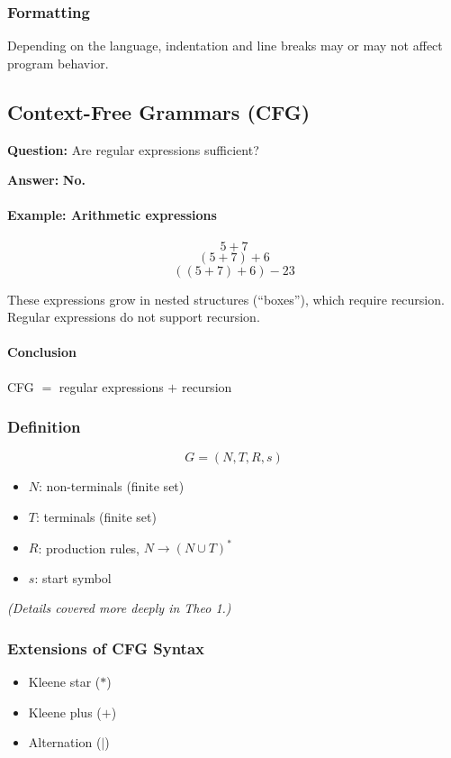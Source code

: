 \documentclass{article}
\begin{document}
\subsubsection{Formatting}
Depending on the language, indentation and line breaks may or may not affect program behavior.


\subsection{Context-Free Grammars (CFG)}

\textbf{Question:} Are regular expressions sufficient?

\textbf{Answer:} \textbf{No.}

\paragraph{Example: Arithmetic expressions}
\[
5 + 7
\]
\[
(5 + 7) + 6
\]
\[
((5 + 7) + 6) - 23
\]

These expressions grow in nested structures (``boxes''), which require recursion.  
Regular expressions do not support recursion.

\paragraph{Conclusion}
CFG $=$ regular expressions $+$ recursion

\subsubsection{Definition}
\[
G = (N, T, R, s)
\]
\begin{itemize}
  \item $N$: non-terminals (finite set)
  \item $T$: terminals (finite set)
  \item $R$: production rules, $N \to (N \cup T)^*$
  \item $s$: start symbol
\end{itemize}

\textit{(Details covered more deeply in Theo 1.)}

\subsubsection{Extensions of CFG Syntax}
\begin{itemize}
  \item Kleene star ($*$)
  \item Kleene plus ($+$)
  \item Alternation ($|$)
\end{itemize}
\end{document}
